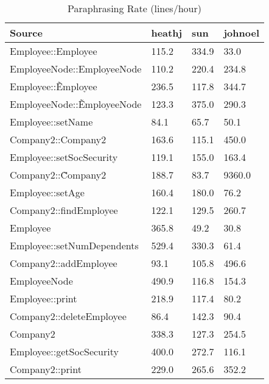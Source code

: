 \begin{table}[hb]
\begin{center}
\begin{tabular}{|l|l|l|l|}
\hline
Source & heathj & sun & johnoel\\
\hline
Employee::Employee & 115.2 & 334.9 & 33.0\\
EmployeeNode::EmployeeNode & 110.2 & 220.4 & 234.8\\
Employee::\~Employee & 236.5 & 117.8 & 344.7\\
EmployeeNode::\~EmployeeNode & 123.3 & 375.0 & 290.3\\
Employee::setName & 84.1 & 65.7 & 50.1\\
Company2::Company2 & 163.6 & 115.1 & 450.0\\
Employee::setSocSecurity & 119.1 & 155.0 & 163.4\\
Company2::\~Company2 & 188.7 & 83.7 & 9360.0\\
Employee::setAge & 160.4 & 180.0 & 76.2\\
Company2::findEmployee & 122.1 & 129.5 & 260.7\\
Employee & 365.8 & 49.2 & 30.8\\
Employee::setNumDependents & 529.4 & 330.3 & 61.4\\
Company2::addEmployee & 93.1 & 105.8 & 496.6\\
EmployeeNode & 490.9 & 116.8 & 154.3\\
Employee::print & 218.9 & 117.4 & 80.2\\
Company2::deleteEmployee & 86.4 & 142.3 & 90.4\\
Company2 & 338.3 & 127.3 & 254.5\\
Employee::getSocSecurity & 400.0 & 272.7 & 116.1\\
Company2::print & 229.0 & 265.6 & 352.2\\
\hline
\end{tabular}
\end{center}
\caption{Paraphrasing Rate (lines/hour)}
\end{table}

